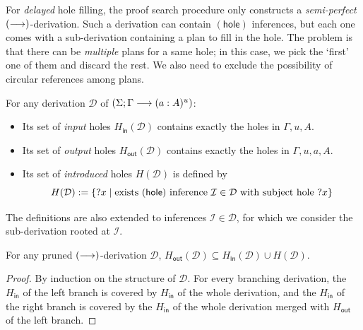 \documentclass[twoside]{report}
\begin{document}
For \emph{delayed} hole filling, the proof search procedure only constructs a \emph{semi-perfect} $(\longrightarrow)$-derivation. Such a derivation can contain $(\mathsf{hole})$ inferences, but each one comes with a sub-derivation containing a plan to fill in the hole. The problem is that there can be \emph{multiple} plans for a same hole; in this case, we pick the `first' one of them and discard the rest. We also need to exclude the possibility of circular references among plans.

\begin{definition}
    \label{def:focused_calculus_hole_sets}
    For any derivation $\mathcal D$ of $(\Sigma; \Gamma \longrightarrow (a : A)^u)$:
    \begin{itemize}[noitemsep]
        \item Its set of \emph{input} holes $H_{\mathsf{in}}(\mathcal D)$ contains exactly the holes in $\Gamma, u, A$.
        \item Its set of \emph{output} holes $H_{\mathsf{out}}(\mathcal D)$ contains exactly the holes in $\Gamma, u, a, A$.
        \item Its set of \emph{introduced} holes $H(\mathcal D)$ is defined by
              $$
                  H(\mathcal D) := \{{?x} \mid \text{exists $(\mathsf{hole})$ inference } \mathcal I \in \mathcal D \text{ with subject hole } {?x}\}
              $$
    \end{itemize}
    The definitions are also extended to inferences $\mathcal I \in \mathcal D$, for which we consider the sub-derivation rooted at $\mathcal I$.
\end{definition}

\begin{proposition}
    \label{thm:focused_calculus_hole_sets}
    For any pruned $(\longrightarrow)$-derivation $\mathcal D$, $H_{\mathsf{out}}(\mathcal D) \subseteq H_{\mathsf{in}}(\mathcal D) \cup H(\mathcal D)$.
\end{proposition}

\begin{proof}
    By induction on the structure of $\mathcal D$. For every branching derivation, the $H_{\mathsf{in}}$ of the left branch is covered by $H_{\mathsf{in}}$ of the whole derivation, and the $H_{\mathsf{in}}$ of the right branch is covered by the $H_{\mathsf{in}}$ of the whole derivation merged with $H_{\mathsf{out}}$ of the left branch.
\end{proof}
\end{document}
